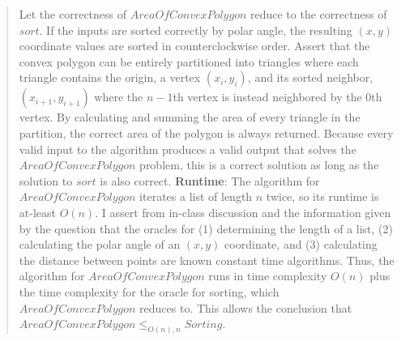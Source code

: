 \documentclass[11pt]{article}
\begin{document}
\begin{enumerate}
\begin{enumerate}
\begin{quote}
            Let the correctness of $AreaOfConvexPolygon$ reduce to the correctness of $sort$. If the inputs are sorted correctly by polar angle, the resulting $(x, y)$ coordinate values are sorted in counterclockwise order. \newline 
            Assert that the convex polygon can be entirely partitioned into triangles where each triangle contains the origin, a vertex $(x_i, y_i)$, and its sorted neighbor, $(x_{i + 1}, y_{i + 1})$ where the $n - 1$th vertex is instead neighbored by the $0$th vertex. \newline
            By calculating and summing the area of every triangle in the partition, the correct area of the polygon is always returned. \newline 
            Because every valid input to the algorithm produces a valid output that solves the $AreaOfConvexPolygon$ problem, this is a correct solution as long as the solution to $sort$ is also correct.
            \newline 
            \newline 
            \textbf{Runtime}:
            The algorithm for $AreaOfConvexPolygon$ iterates a list of length $n$ twice, so its runtime is at-least $O(n)$. I assert from in-class discussion and the information given by the question that the oracles for (1) determining the length of a list, (2) calculating the polar angle of an $(x, y)$ coordinate, and (3) calculating the distance between points are known constant time algorithms. \newline 
            Thus, the algorithm for $AreaOfConvexPolygon$ runs in time complexity $O(n)$ plus the time complexity for the oracle for sorting, which $AreaOfConvexPolygon$ reduces to. This allows the conclusion that $AreaOfConvexPolygon \leq_{O(n), n} Sorting$.
        \end{quote}
        

\end{enumerate}
\end{enumerate}
\end{document}
